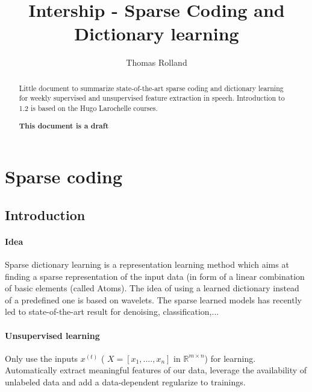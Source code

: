 \documentclass[a4paper,10pt]{article}
\title{Intership - Sparse Coding and Dictionary learning}
\author{Thomas Rolland}
\date{}%
\newcommand{\R}{\mathbb{R}}
\begin{document}
\maketitle

\begin{abstract}
Little document to summarize state-of-the-art sparse coding and dictionary learning for weekly supervised and unsupervised feature extraction in speech. Introduction to 1.2 is based on the Hugo Larochelle courses.\\
\begin{center}

\textbf{This document is a draft }
 
\end{center}
\end{abstract}
\tableofcontents
\section{Sparse coding}
\subsection{Introduction}
\paragraph{Idea} Sparse dictionary learning is a representation learning method which aims at finding a sparse representation of the input data (in form of a linear combination of basic elements (called Atoms). The idea of using a learned dictionary instead of a predefined one is based on wavelets. The sparse learned models has recently led to state-of-the-art result for denoising, classification,...
\paragraph{Unsupervised learning} Only use the inputs $x^{(t)}$ ( $X = [x_1,....,x_n]$ in $\R^{m \times n}$) for learning. Automatically extract meaningful features of our data, leverage the availability of unlabeled data and add a data-dependent regularize to trainings.\\
\end{document}
